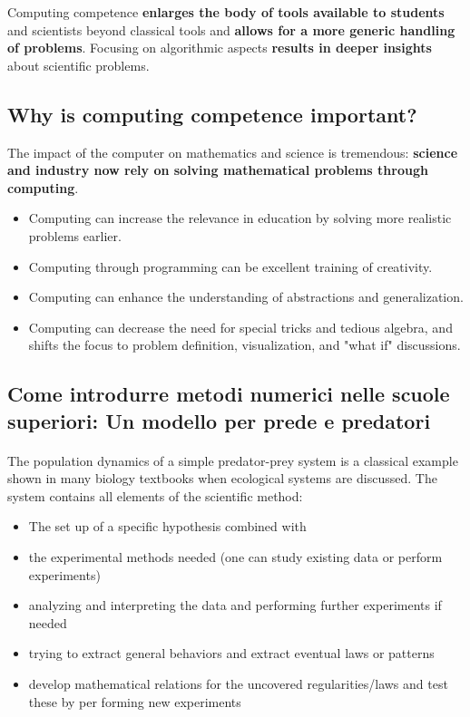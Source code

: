 \documentclass[%
oneside,                 %
final,                   %
10pt]{article}
\begin{document}
Computing competence \textbf{enlarges the body of tools available to students} and
scientists beyond classical tools and \textbf{allows for a more generic
handling of problems}. Focusing on algorithmic aspects \textbf{results in
deeper insights} about scientific problems.





\subsection*{Why is computing competence important?}
The impact of the computer on mathematics and science is tremendous: \textbf{science and industry now rely on solving mathematical problems through computing}.
\begin{itemize}
\item Computing can increase the relevance in education by solving more realistic problems earlier.

\item Computing through programming can be excellent training of creativity.

\item Computing can enhance the understanding of abstractions and generalization.

\item Computing can decrease the need for special tricks and tedious algebra, and shifts the focus to problem definition, visualization, and "what if" discussions.
\end{itemize}

\noindent
\subsection*{Come introdurre metodi numerici nelle scuole superiori: Un modello per prede e predatori}


\paragraph{}
The population dynamics of a simple predator-prey system is a
classical example shown in many biology textbooks when ecological
systems are discussed. The system contains all elements of the
scientific method:

\begin{itemize}
 \item The set up of a specific hypothesis combined with

 \item the experimental methods needed (one can study existing data or perform experiments)

 \item analyzing and interpreting the data and performing further experiments if needed

 \item trying to extract general behaviors and extract eventual laws or patterns

 \item develop mathematical relations for the uncovered regularities/laws and test these by per forming new experiments
\end{itemize}
\end{document}
